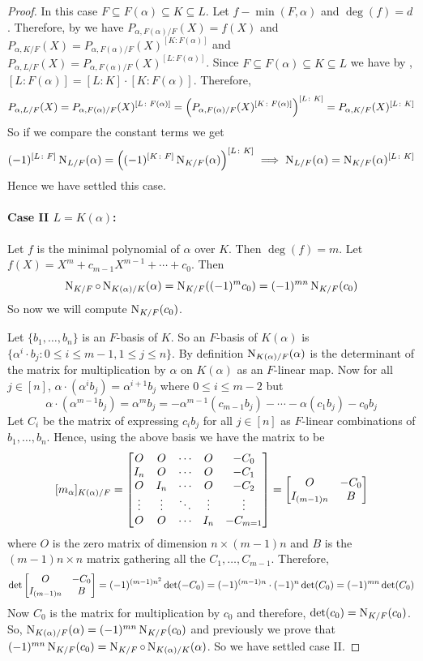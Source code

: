 \begin{proof}
  In this case $F\subseteq F(\alpha)\subseteq K\subseteq L$. Let $f-\min(F,\alpha)$ and $\deg(f)=d$. Therefore, by \CharPolyMinPolythm we have $P_{\alpha,F(\alpha)/F}(X)=f(X)$ and $P_{\alpha,K/F}(X)=P_{\alpha,F(\alpha)/F}(X)^{[K\colon F(\alpha)]}$ and $P_{\alpha,L/F}(X)=P_{\alpha,F(\alpha)/F}(X)^{[L\colon F(\alpha)]}$. Since $F\subseteq F(\alpha)\subseteq K\subseteq L$ we have by \TowerLawthm, $[L\colon F(\alpha)]=[L\colon K]\cdot [K\colon F(\alpha)]$. Therefore, $$P_{\alpha,L/F}(X)=P_{\alpha,F(\alpha)/F}(X)^{[L\colon F(\alpha)]}=\left(P_{\alpha,F(\alpha)/F}(X)^{[K\colon F(\alpha)]}\right)^{[L\colon K]}=P_{\alpha,K/F}(X)^{[L\colon K]}$$So if we compare the constant terms we get $$(-1)^{[L\colon F]}\operatorname{N}_{L/F}(\alpha)=\left((-1)^{[K\colon F]}\operatorname{N}_{K/F}(\alpha)\right)^{[L\colon K]}\implies \operatorname{N}_{L/F}(\alpha)=\operatorname{N}_{K/F}(\alpha)^{[L\colon K]}$$Hence we have settled this case.

  \paragraph*{Case II $L=K(\alpha)$:} Let $f$ is the minimal polynomial of $\alpha$ over $K$. Then $\deg(f)=m$. Let $f(X)=X^m+c_{m-1}X^{m-1}+\cdots+c_0$. Then $$\operatorname{N}_{K/F}\circ \operatorname{N}_{K(\alpha)/K}(\alpha)=\operatorname{N}_{K/F}((-1)^mc_0)=(-1)^{mn}\operatorname{N}_{K/F}(c_0)$$So now we will compute $\operatorname{N}_{K/F}(c_0)$.

  Let $\{b_1,\dots, b_n\}$ is an $F$-basis of $K$. So an $F$-basis of $K(\alpha)$ is $\{\alpha^i\cdot b_j\colon 0\leq i\leq m-1,1\leq j\leq n\}$. By definition $\operatorname{N}_{K(\alpha)/F}(\alpha)$ is the determinant of the matrix for multiplication by $\alpha$ on $K(\alpha)$ as an $F$-linear map. Now for all $j\in[n]$, $\alpha\cdot (\alpha^ib_j)=\alpha^{i+1}b_j$ where $0\leq i\leq m-2$ but $$\alpha\cdot (\alpha^{m-1}b_j)=\alpha^mb_j=-\alpha^{m-1}(c_{m-1}b_j)-\cdots -\alpha(c_1b_j)-c_0b_j$$Let $C_i$ be the matrix of expressing $c_ib_j$ for all $j\in[n]$ as $F$-linear combinations of $b_1,\dots, b_n$. Hence, using the above basis we have the matrix to be $$[m_{\alpha}]_{K(\alpha)/F}=\left[\begin{matrix}O & O & \cdots & O & -C_0\\ I_n & O & \cdots & O & -C_1\\ O & I_n & \cdots & O & -C_2\\ \vdots & \vdots & \ddots & \vdots & \vdots \\ O & O & \cdots & I_n & -C_{m=1}\end{matrix}\right]=\left[\begin{matrix}O & -C_0\\ I_{(m-1)n}& B\end{matrix}\right]$$where $O$ is the zero matrix of dimension $n\times (m-1)n$ and $B$ is the $(m-1)n\times n$ matrix gathering all the $C_1,\dots, C_{m-1}$. Therefore, $$\det\left[\begin{matrix}O & -C_0\\ I_{(m-1)n}& B\end{matrix}\right]=(-1)^{(m-1)n^2}\det(-C_0)=(-1)^{(m-1)n}\cdot (-1)^n\det(C_0)=(-1)^{mn}\det(C_0)$$Now $C_0$ is the matrix for multiplication by $c_0$ and therefore, $\det(c_0)=\operatorname{N}_{K/F}(c_0)$.  So, $\operatorname{N}_{K(\alpha)/F}(\alpha)=(-1)^{mn}\operatorname{N}_{K/F}(c_0)$ and previously we prove that $(-1)^{mn}\operatorname{N}_{K/F}(c_0)=\operatorname{N}_{K/F}\circ \operatorname{N}_{K(\alpha)/K}(\alpha)$. So we have settled case II.


\end{proof}
